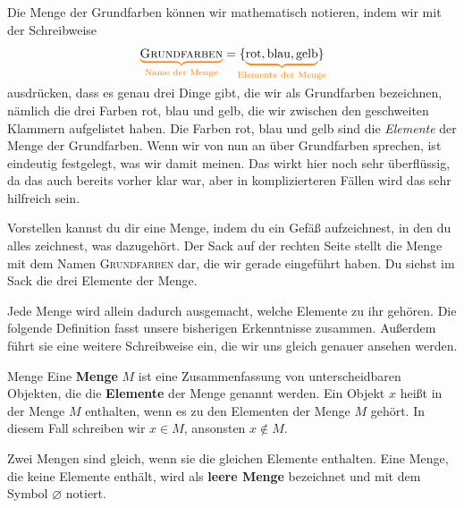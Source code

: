 \documentclass[../../main.tex]{subfiles}
\begin{document}
\begin{example}{}

    Die Menge der Grundfarben können wir mathematisch notieren, indem wir mit der Schreibweise
    \[\colorbrace{\textsc{Grundfarben}}{\text{Name der Menge}}=\{\colorbrace{\text{rot},\text{blau},\text{gelb}}{\text{Elemente der Menge}}\}\]
    ausdrücken, dass es genau drei Dinge gibt, die wir als Grundfarben bezeichnen, nämlich die drei Farben rot, blau und gelb, die wir zwischen den geschweiten Klammern aufgelistet haben. Die Farben rot, blau und gelb sind die \emph{Elemente} der Menge der Grundfarben. Wenn wir von nun an über Grundfarben sprechen, ist eindeutig festgelegt, was wir damit meinen. Das wirkt hier noch sehr überflüssig, da das auch bereits vorher klar war, aber in komplizierteren Fällen wird das sehr hilfreich sein.

    Vorstellen kannst du dir eine Menge, indem du ein Gefäß aufzeichnest, in den du alles zeichnest, was dazugehört. Der Sack auf der rechten Seite stellt die Menge mit dem Namen \textsc{Grundfarben} dar, die wir gerade eingeführt haben. Du siehst im Sack die drei Elemente der Menge.
\end{example}

Jede Menge wird allein dadurch ausgemacht, welche Elemente zu ihr gehören. Die folgende Definition fasst unsere bisherigen Erkenntnisse zusammen. Außerdem führt sie eine weitere Schreibweise ein, die wir uns gleich genauer ansehen werden.

\begin{definition}{Menge}
    Eine \textbf{Menge} $M$ ist eine Zusammenfassung von unterscheidbaren Objekten, die die \textbf{Elemente} der Menge genannt werden. Ein Objekt $x$ heißt in der Menge $M$ enthalten, wenn es zu den Elementen der Menge $M$ gehört. In diesem Fall schreiben wir $x\in M$, ansonsten $x\notin M$.

    Zwei Mengen sind gleich, wenn sie die gleichen Elemente enthalten. Eine Menge, die keine Elemente enthält, wird als \textbf{leere Menge} bezeichnet und mit dem Symbol $\varnothing$ notiert.
\end{definition}
\end{document}
